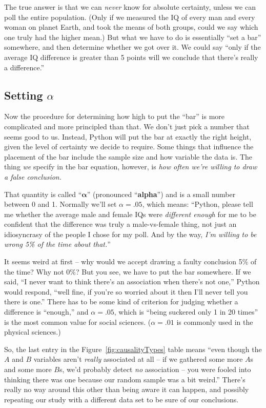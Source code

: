 The true answer is that we can \textit{never} know for absolute certainty,
unless we can poll the entire population. (Only if we measured the IQ of every
man and every woman on planet Earth, and took the means of both groups, could
we say which one truly had the higher mean.) But what we have to do is
essentially ``set a bar'' somewhere, and then determine whether we got over it.
We could say ``only if the average IQ difference is greater than 5 points will
we conclude that there's really a difference.''

\subsection{Setting $\alpha$}

\label{alpha}

Now the procedure for determining how high to put the ``bar'' is more
complicated and more principled than that. We don't just pick a number that
seems good to us. Instead, Python will put the bar at exactly the right height,
given the level of certainty we decide to require. Some things that influence
the placement of the bar include the sample size and how variable the data is.
The thing \textit{we} specify in the bar equation, however, is \textit{how
often we're willing to draw a false conclusion.}


That quantity is called ``$\boldsymbol{\alpha}$'' (pronounced
``\textbf{alpha}'') and is a small number between 0 and 1. Normally we'll set
$\alpha=.05$, which means: ``Python, please tell me whether the average male
and female IQs were \textit{different enough} for me to be confident that the
difference was truly a male-vs-female thing, not just an idiosyncrasy of the
people I chose for my poll. And by the way, \textit{I'm willing to be wrong 5\%
of the time about that.}''

It seems weird at first -- why would we accept drawing a faulty conclusion 5\%
of the time? Why not 0\%? But you see, we have to put the bar somewhere. If we
said, ``I never want to think there's an association when there's not one,''
Python would respond, ``well fine, if you're so worried about it then I'll
never tell you there is one.'' There has to be some kind of criterion for
judging whether a difference is ``enough,'' and $\alpha=.05$, which is ``being
suckered only 1 in 20 times'' is the most common value for social sciences.
($\alpha=.01$ is commonly used in the physical sciences.)

So, the last entry in the Figure~\ref{fig:causalityTypes} table means ``even
though the $A$ and $B$ variables aren't \textit{really} associated at all -- if
we gathered some more $A$s and some more $B$s, we'd probably detect \textit{no}
association -- you were fooled into thinking there was one because our random
sample was a bit weird.'' There's really no way around this other than being
aware it can happen, and possibly repeating our study with a different data
set to be sure of our conclusions.
